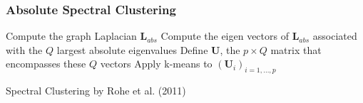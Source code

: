 \documentclass{beamer}\usepackage[]{graphicx}\usepackage[]{color}
\begin{document}
\begin{frame}
  \frametitle{Absolute Spectral Clustering}

\begin{algorithm}[H]
  \BlankLine\BlankLine
  \DontPrintSemicolon
  
  Compute the graph Laplacian $\mathbf{L}_{abs}$\;
  Compute the eigen vectors of $\mathbf{L}_{abs}$ associated with the $Q$ \alert{largest} absolute eigenvalues\;
  Define $\mathbf{U}$,  the $p\times Q$ matrix  that encompasses these $Q$ vectors \;
  Apply k-means to $(\mathbf{U}_i)_{i=1,\dots,p}$

  \BlankLine\BlankLine

  \caption{Spectral Clustering by Rohe et al. (2011)}
\end{algorithm}

\end{frame}
\end{document}
